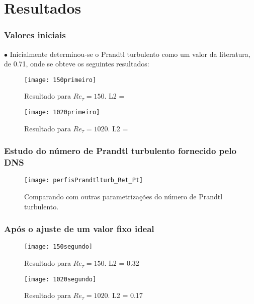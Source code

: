 \documentclass[xcolor=dvipsnames,10pt,aspectratio=169]{beamer}
\begin{document}
	\section{Resultados}
		\begin{frame}
			\frametitle{Valores iniciais}
				$\bullet$ Inicialmente determinou-se o Prandtl turbulento como um valor da literatura, de 0.71, onde se obteve os seguintes resultados:\\
			\begin{minipage}[h!]{0.45\textwidth}
			\begin{figure}
				\centering
				\texttt{[image: 150primeiro]}
				\caption{Resultado para $Re_\tau = 150$. L2 = }
				\label{temperatura}
			\end{figure}
			\end{minipage}\hfill
				\begin{minipage}[h!]{0.45\textwidth}
				\begin{figure}
					\centering
					\texttt{[image: 1020primeiro]}
					\caption{Resultado para $Re_\tau = 1020$. L2 = }
					\label{temperatura}
				\end{figure}
			\end{minipage}		
		\end{frame}
	
	
	
	
		
		\begin{frame}
		\frametitle{Estudo do número de Prandtl turbulento fornecido pelo DNS}
		\begin{figure}
			\centering
			\texttt{[image: perfisPrandtlturb\_Ret\_Pt]}
			\caption{Comparando com outras parametrizações do número de Prandtl turbulento.}
			\label{temperatura}
		\end{figure}
		\end{frame}
		
		
		
		
		
		\begin{frame}
		\frametitle{Após o ajuste de um valor fixo ideal}
		\begin{minipage}[h!]{0.45\textwidth}
			\begin{figure}
				\centering
				\texttt{[image: 150segundo]}
				\caption{Resultado para $Re_\tau = 150$. L2 = 0.32}
				\label{temperatura}
			\end{figure}
		\end{minipage}\hfill
		\begin{minipage}[h!]{0.45\textwidth}
			\begin{figure}
				\centering
				\texttt{[image: 1020segundo]}
				\caption{Resultado para $Re_\tau = 1020$. L2 = 0.17}
				\label{temperatura}
			\end{figure}
		\end{minipage}		
		\end{frame}	
	
\end{document}
